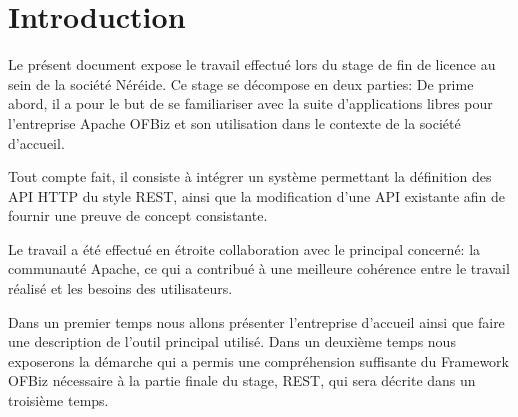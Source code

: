 \chapter{Introduction}

Le présent document expose le travail effectué lors du stage de fin de licence au sein de la société Néréide.
Ce stage se décompose en deux parties: 
De prime abord, il a pour le but de se familiariser avec la suite d'applications libres
pour l'entreprise
Apache OFBiz et son utilisation dans le contexte de la société d'accueil. 

Tout compte fait, il consiste à intégrer un système permettant la définition des API HTTP
du style REST,
 ainsi que la modification d'une API existante afin de fournir une preuve de concept consistante. 

Le travail a été effectué en étroite collaboration avec le principal concerné: la communauté Apache,
ce qui a contribué à une meilleure cohérence entre le travail réalisé et les besoins 
des utilisateurs.

Dans un premier temps nous allons présenter l'entreprise d'accueil ainsi que faire une description de
l'outil principal utilisé.
Dans un deuxième temps nous exposerons la démarche qui a permis une compréhension suffisante du Framework OFBiz
 nécessaire à la partie finale du stage, REST, qui sera décrite dans un troisième temps. 

